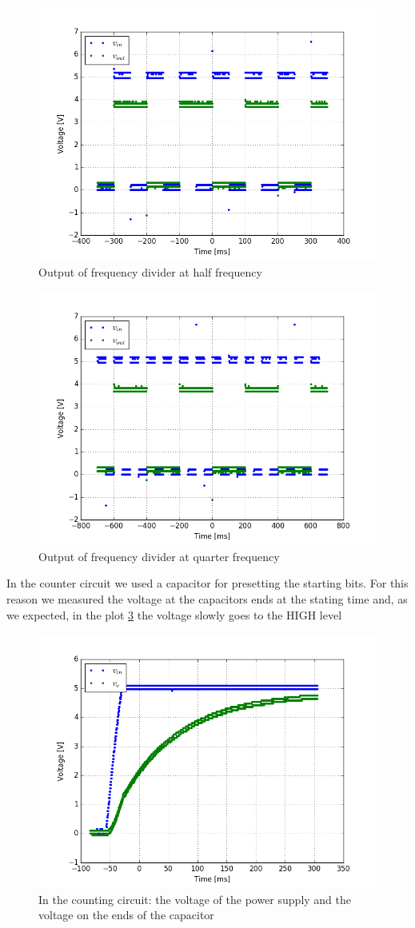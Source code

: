 \begin{figure}[H]
\centering
\includegraphics[width=.7\textwidth]{11/freq_div_m.png}
\caption{Output of frequency divider at half frequency}\label{freq_div_m}
\end{figure}
\begin{figure}[H]
\centering
\includegraphics[width=.7\textwidth]{11/freq_div_q.png}
\caption{Output of frequency divider at quarter frequency}\label{freq_div_q}
\end{figure}
In the counter circuit we used a capacitor for presetting the starting bits. For this reason we measured the voltage at the capacitors ends at the stating time and, as we expected, in the plot \ref{start_count} the voltage slowly goes to the HIGH level
\begin{figure}[H]
\centering
\includegraphics[width=.7\textwidth]{11/start_count.png}
\caption{In the counting circuit: the voltage of the power supply and the voltage on the ends of the capacitor}\label{start_count}
\end{figure}